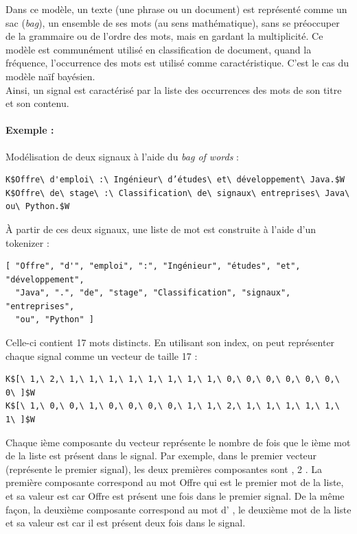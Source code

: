                 Dans ce modèle, un texte (une phrase ou un document) est représenté comme un sac (\textit{bag}), un ensemble de ses mots (au sens mathématique), sans se préoccuper de la grammaire ou de l'ordre des mots, mais en gardant la multiplicité. Ce modèle est communément utilisé en classification de document, quand la fréquence, l’occurrence des mots est utilisé comme caractéristique. C'est le cas du modèle naïf bayésien.\\

                Ainsi, un signal est caractérisé par la liste des occurrences des mots de son titre et son contenu.

            \paragraph{Exemple :}
                Modélisation de deux signaux à l'aide du \textit{bag of words} :
\begin{lstlisting}
K$Offre\ d'emploi\ :\ Ingénieur\ d’études\ et\ développement\ Java.$W
K$Offre\ de\ stage\ :\ Classification\ de\ signaux\ entreprises\ Java\ ou\ Python.$W
\end{lstlisting}
                À partir de ces deux signaux, une liste de mot est construite à l'aide d'un tokenizer :
\begin{verbatim}
[ "Offre", "d'", "emploi", ":", "Ingénieur", "études", "et", "développement",
  "Java", ".", "de", "stage", "Classification", "signaux", "entreprises",
  "ou", "Python" ]
\end{verbatim}
                Celle-ci contient 17 mots distincts. En utilisant son index, on peut représenter chaque signal comme un vecteur de taille 17 :
\begin{lstlisting}
K$[\ 1,\ 2,\ 1,\ 1,\ 1,\ 1,\ 1,\ 1,\ 1,\ 1,\ 0,\ 0,\ 0,\ 0,\ 0,\ 0,\ 0\ ]$W
K$[\ 1,\ 0,\ 0,\ 1,\ 0,\ 0,\ 0,\ 0,\ 1,\ 1,\ 2,\ 1,\ 1,\ 1,\ 1,\ 1,\ 1\ ]$W
\end{lstlisting}
                Chaque ième composante du vecteur représente le nombre de fois que le ième mot de la liste est présent dans le signal. Par exemple, dans le premier vecteur (représente le premier signal), les deux premières composantes sont , 2 \fg. La première composante correspond au mot \og Offre \fg qui est le premier mot de la liste, et sa valeur est  \fg car \og Offre \fg est présent une fois dans le premier signal. De la même façon, la deuxième composante correspond au mot \og d' \fg, le deuxième mot de la liste et sa valeur est  \fg car il est présent deux fois dans le signal.\\

